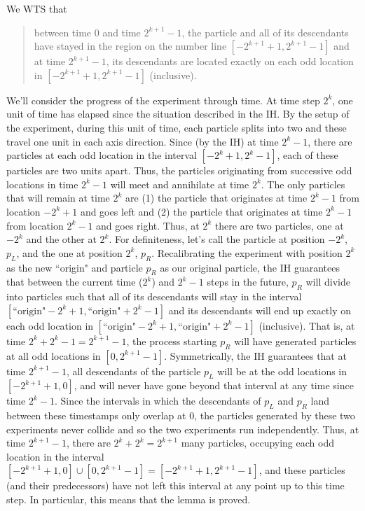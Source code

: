 \begin{description}
{{\begin{itemize}
    We WTS that
    \begin{quote}
      between time $0$ and time $2^{k+1}-1$, 
      the particle and all of its descendants have stayed in the region on the number 
      line $[-2^{k+1}+1, 2^{k+1}-1]$ and at time $2^{k+1}-1$, 
      its descendants are located exactly
      on each odd location in $[-2^{k+1}+1,2^{k+1}-1]$ (inclusive).
    \end{quote}
    We'll consider the progress of the experiment through time.  At time step
    $2^k$, one unit of time has elapsed since the situation described in the IH.
    By the setup of the experiment, during this unit of time, each particle splits into
    two and these travel one unit in each axis direction.  Since (by the IH) 
    at time $2^k-1$, there are particles
    at each odd location in the interval $[-2^{k}+1,2^k-1]$, each of these particles
    are two units apart.  Thus, the particles originating from successive
    odd locations in time $2^{k}-1$ will meet and annihilate at time $2^k$. 
    The only particles that will remain at time $2^k$ are (1) the particle that originates
    at time $2^k-1$ from location $-2^k +1$ and goes left and (2) the particle that 
    originates at time $2^k-1$ from location $2^k-1$ and goes right.  Thus, 
    at $2^k$ there are two particles, one at $-2^k$ and the other at $2^k$.
    For definiteness, let's call the particle at position $-2^k$, $p_L$, and the one
    at position $2^k$, $p_R$.    Recalibrating the experiment with position $2^k$ as
    the new ``origin" and particle $p_R$ as our original particle, the IH guarantees that 
    between the current time ($2^k$) and $2^k-1$ steps in the future, $p_R$ will
    divide into particles such that all of its descendants 
    will stay in the interval $[\text{``origin"}-2^{k}+1, \text{``origin"}+2^{k}-1]$ 
    and  its descendants will end up exactly
    on each odd location in $[\text{``origin"}-2^{k}+1, \text{``origin"}+2^{k}-1]$
    (inclusive).  That is, at time $2^k+2^k-1 = 2^{k+1}-1$, the process 
    starting $p_R$ will have generated particles at all odd locations
    in $[0, 2^{k+1}-1]$.  Symmetrically, the IH guarantees that at time $2^{k+1}-1$,
    all descendants of the particle $p_L$  will be at the odd locations in
    $[-2^{k+1}+1, 0]$, and will never have gone beyond that interval at any time 
    since 
    time $2^{k}-1$.  Since the intervals in which the descendants of $p_L$ and 
    $p_R$ land between these timestamps only overlap at $0$, the particles
    generated by these two experiments never collide and so the two 
    experiments run independently.  Thus, at time $2^{k+1}-1$, there
    are $2^k + 2^k = 2^{k+1}$ many particles, occupying each odd location in the interval
    $[-2^{k+1}+1, 0] \cup [0, 2^{k+1}-1] = [-2^{k+1}+1, 2^{k+1}-1]$, and 
    these particles (and their predecessors) have not left this interval at any point 
    up to this time step.  In particular, this means that the lemma is proved.
  \end{itemize} }}
\else{}
\fi


\end{description}
